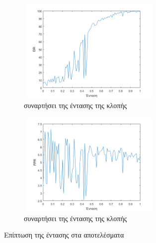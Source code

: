 \begin{figure}[ht!]
\centering
\begin{subfigure}[b]{0.4\textwidth}
 \includegraphics[width=70mm, height=50mm]{../../plots/gr_bigres_dr_intensity_un_sup.png}
\caption{ συναρτήσει της έντασης της κλοπής}
\label{fig:unsupDRintensity}
\end{subfigure}
\quad
\begin{subfigure}[b]{0.4\textwidth}
\includegraphics[width=70mm, height=50mm]{../../plots/gr_bigres_fpr_intensity_un_sup.png}
\caption{ συναρτήσει της έντασης της κλοπής}
\label{fig:linearFPRintensity}
\end{subfigure}
\caption{Επίπτωση της έντασης στα αποτελέσματα}
\label{fig:unsupintensityres}
\end{figure}


